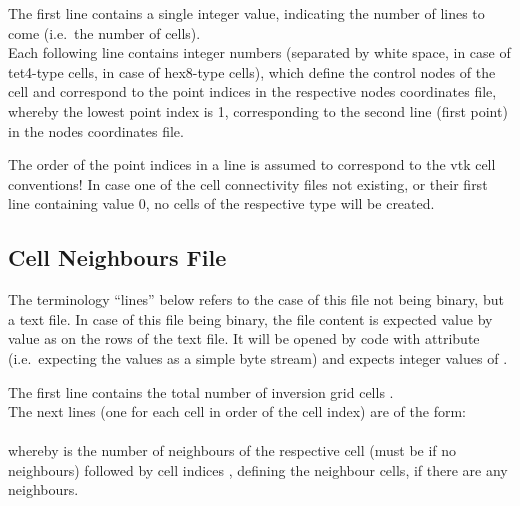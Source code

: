The first line contains a single integer value, indicating the number of lines to come (i.e.\ the 
number of cells).\\
Each following line contains  integer numbers (separated by white space,  
in case of tet4-type cells,  in case of hex8-type cells), which define the control nodes 
of the cell and correspond to the point indices in the respective nodes coordinates file, whereby the 
lowest point index is 1, corresponding to the second line (first point) in the nodes coordinates file.

The order of the point indices in a line is assumed to correspond to the vtk cell conventions!
In case one of the cell connectivity files not existing, or their first line containing value 0, no cells
of the respective type will be created.

\subsection{Cell Neighbours File}
The terminology ``lines'' below refers to the case of this file not being binary, but a text file. 
In case of this file being binary, the file content is expected value by value as on the rows of the
text file. It will be opened by  code with attribute 
(i.e.\ expecting the values as a simple byte stream) and expects integer values of .

The first line contains the total number of inversion grid cells .\\
The next  lines (one for each cell in order of the cell index) are of the form:\\
\\
whereby  is the number of neighbours of the respective cell (must be  if 
no neighbours) followed by  cell indices , defining 
the neighbour cells, if there are any neighbours.


